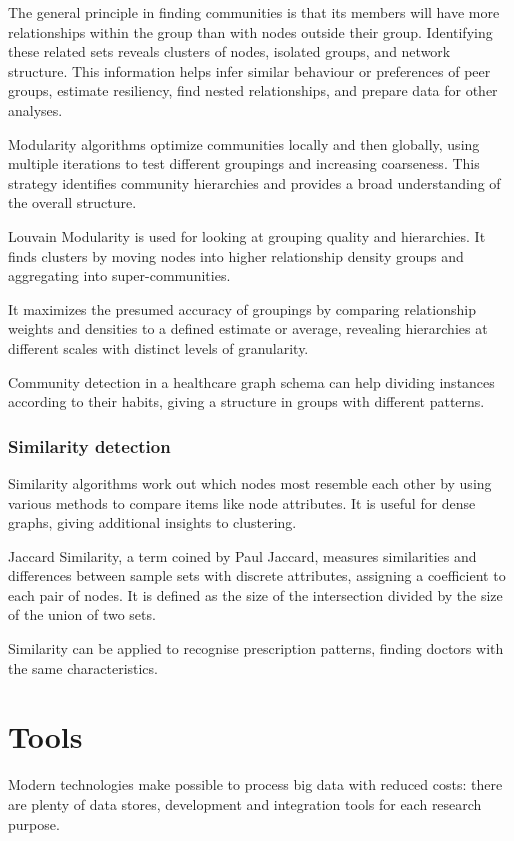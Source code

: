 The general principle in finding communities is that its members will have more relationships within the group than with nodes outside their group. Identifying these related sets reveals clusters of nodes, isolated groups, and network structure. This information helps infer similar behaviour or preferences of peer groups, estimate resiliency, find nested relationships, and prepare data for other analyses.

Modularity algorithms optimize communities locally and then globally, using multiple iterations to test different groupings and increasing coarseness. This strategy identifies community hierarchies and provides a broad understanding of the overall structure.

Louvain Modularity is used for looking at grouping quality and hierarchies. It finds clusters by moving nodes into higher relationship density groups and aggregating into super-communities.

It maximizes the presumed accuracy of groupings by comparing relationship weights and densities to a defined estimate or average, revealing hierarchies at different scales with distinct levels of granularity.

Community detection in a healthcare graph schema can help dividing instances according to their habits, giving a structure in groups with different patterns.

\subsubsection{Similarity detection}
Similarity algorithms work out which nodes most resemble each other by using various methods to compare items like node attributes. It is useful for dense graphs, giving additional insights to clustering.

Jaccard Similarity, a term coined by Paul Jaccard, measures similarities and differences between sample sets with discrete attributes, assigning a coefficient to each pair of nodes. It is defined as the size of the intersection divided by the size of the union of two sets. 

Similarity can be applied to recognise prescription patterns, finding doctors with the same characteristics.

\section{Tools}
Modern technologies make possible to process big data with reduced costs: there are plenty of data stores, development and integration tools for each research purpose. 

